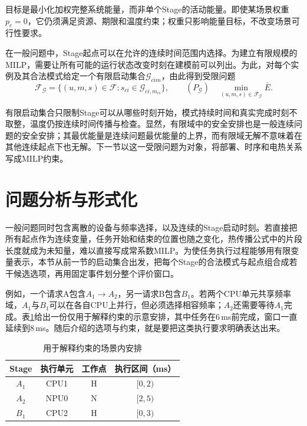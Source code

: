 目标是最小化加权完整系统能量，而非单个Stage的活动能量。即使某场景权重$p_c=0$，它仍须满足资源、期限和温度约束；权重只影响能量目标，不改变场景可行性要求。

在一般问题中，Stage起点可以在允许的连续时间范围内选择。为建立有限规模的MILP，需要让所有可能的运行状态改变时刻在建模前可以列出。为此，对每个实例及其合法模式给定一个有限启动集合$\mathcal G_{cim}$，由此得到受限问题
\begin{equation}
\mathcal F_{\mathcal G}=\{(u,m,s)\in\mathcal F:
s_{ci}\in\mathcal G_{ci,m_{ci}}\},\qquad
(P_{\mathcal G})\quad\min_{(u,m,s)\in\mathcal F_{\mathcal G}}\bar E.
\label{eq:finite-start-problem}
\end{equation}

有限启动集合只限制Stage可以从哪些时刻开始，模式持续时间和真实完成时刻不取整，温度仍按连续时间传播与检查。显然，有限域中的安全安排也是一般连续问题的安全安排；其最优能量是连续问题最优能量的上界，而有限域无解不意味着在其他连续起点下也无解。下一节以这一受限问题为对象，将部署、时序和电热关系写成MILP约束。



\section{问题分析与形式化}

一般问题同时包含离散的设备与频率选择，以及连续的Stage启动时刻。若直接把所有起点作为连续变量，任务开始和结束的位置也随之变化，热传播公式中的片段长度就成为未知量，难以直接写成常系数MILP。为使任务执行过程能够用有限变量表示，本节从前一节的启动集合出发，把每个Stage的合法模式与起点组合成若干候选选项，再用固定事件划分整个评价窗口。

例如，一个请求A包含$A_1\rightarrow A_2$，另一请求B包含$B_1$。若两个CPU单元共享频率域，$A_1$与$B_1$可以在各自CPU上并行，但必须选择相容频率；$A_2$还需要等待$A_1$完成。表\ref{tab:constraint-example}给出一份仅用于解释约束的示意安排，其中任务在6\,ms前完成，窗口一直延续到8\,ms。随后介绍的选项与约束，就是要把这类执行要求明确表达出来。
\begin{table}[htbp]
\centering
\caption{用于解释约束的场景内安排}
\label{tab:constraint-example}
\begin{tabular}{cccc}
\toprule
Stage & 执行单元 & 工作点 & 执行区间（ms） \\
\midrule
\(A_1\) & CPU1 & H & $[0,2)$ \\
\(A_2\) & NPU0 & N & $[2,5)$ \\
\(B_1\) & CPU2 & H & $[0,3)$ \\
\bottomrule
\end{tabular}
\end{table}

